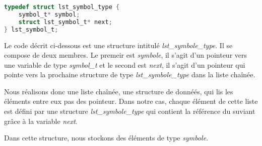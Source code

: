 \lstset{style=mystyle}
\begin{lstlisting}[language=C, caption=Structure d'une liste de symbole]
typedef struct lst_symbol_type {
    symbol_t* symbol;
    struct lst_symbol_t* next;
} lst_symbol_t;

\end{lstlisting}

Le code décrit ci-dessous est une structure intitulé \textit{lst\_symbole\_type}. Il se compose de deux membres. Le premeir est \textit{symbole}, il s'agit d'un pointeur vers une variable de type \textit{symbol\_t} et le second est \textit{next}, il s'agit d'un pointeur qui pointe vers la prochaine structure de type \textit{lst\_symbole\_type} dans la liste chaînée.

Nous réalisons donc une liste chaînée, une structure de donnéés, qui lis les éléments entre eux pas des pointeur.  Dans notre cas, chaque élément de cette liste est défini par une structure \textit{lst\_symbole\_type} qui contient la référence du suviant grâce à la variable \textit{next}.

Dans cette structure, nous stockons des éléments de type \textit{symbole}.


\newpage